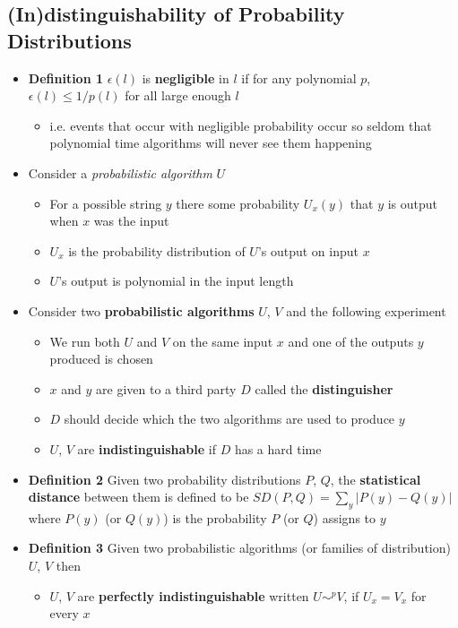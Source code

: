 \subsection{(In)distinguishability of Probability Distributions}
\begin{itemize}
  \item \textbf{Definition 1} $\epsilon(l)$ is \textbf{negligible} in $l$ if for any polynomial $p$, $\epsilon(l) \leq 1/p(l)$ for all large enough $l$
  \begin{itemize}
  	\item i.e. events that occur with negligible probability occur so seldom that polynomial time algorithms will never see them happening
  \end{itemize}
  \item Consider a \textit{probabilistic algorithm} $U$
  \begin{itemize}
  	\item For a possible string $y$ there some probability $U_x(y)$ that $y$ is output when $x$ was the input
  	\item $U_x$ is the probability distribution of $U$'s output on input $x$
  	\item $U$'s output is polynomial in the input length
  \end{itemize}
  \item Consider two \textbf{probabilistic algorithms} $U$, $V$ and the following experiment
  \begin{itemize}
  	\item We run both $U$ and $V$ on the same input $x$ and one of the outputs $y$ produced is chosen
  	\item $x$ and $y$ are given to a third party $D$ called the \textbf{distinguisher}
  	\item $D$ should decide which the two algorithms are used to produce $y$
  	\item $U$, $V$ are \textbf{indistinguishable} if $D$ has a hard time
  \end{itemize}
  \item \textbf{Definition 2} Given two probability distributions $P$, $Q$, the \textbf{statistical distance} between them is defined to be $SD(P,Q) = \sum_y |P(y)-Q(y)|$ where $P(y)$ (or $Q(y)$) is the probability $P$ (or $Q$) assigns to $y$
  \item \textbf{Definition 3} Given two probabilistic algorithms (or families of distribution) $U$, $V$ then 
  \begin{itemize}
  	\item $U$, $V$ are \textbf{perfectly indistinguishable} written $U \sim^p V$, if $U_x = V_x$ for every $x$

\end{itemize}
\end{itemize}
